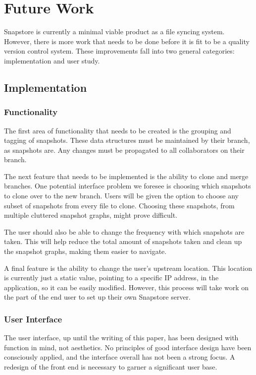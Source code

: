 \chapter{Future Work}

Snapstore is currently a minimal viable product as a file syncing system. However, there is more work that needs to be done before it is fit to be a quality version control system. These improvements fall into two general categories: implementation and user study. 

\section{Implementation}

\subsection{Functionality}

The first area of functionality that needs to be created is the grouping and tagging of snapshots. These data structures must be maintained by their branch, as snapshots are. Any changes must be propagated to all collaborators on their branch.

The next feature that needs to be implemented is the ability to clone and merge branches. One potential interface problem we foresee is choosing which snapshots to clone over to the new branch. Users will be given the option to choose any subset of snapshots from every file to clone. Choosing these snapshots, from multiple cluttered snapshot graphs, might prove difficult.

The user should also be able to change the frequency with which snapshots are taken. This will help reduce the total amount of snapshots taken and clean up the snapshot graphs, making them easier to navigate.

A final feature is the ability to change the user's upstream location. This location is currently just a static value, pointing to a specific IP address, in the application, so it can be easily modified. However, this process will take work on the part of the end user to set up their own Snapstore server.

\subsection{User Interface}

The user interface, up until the writing of this paper, has been designed with function in mind, not aesthetics. No principles of good interface design have been consciously applied, and the interface overall has not been a strong focus. A redesign of the front end is necessary to garner a significant user base.

